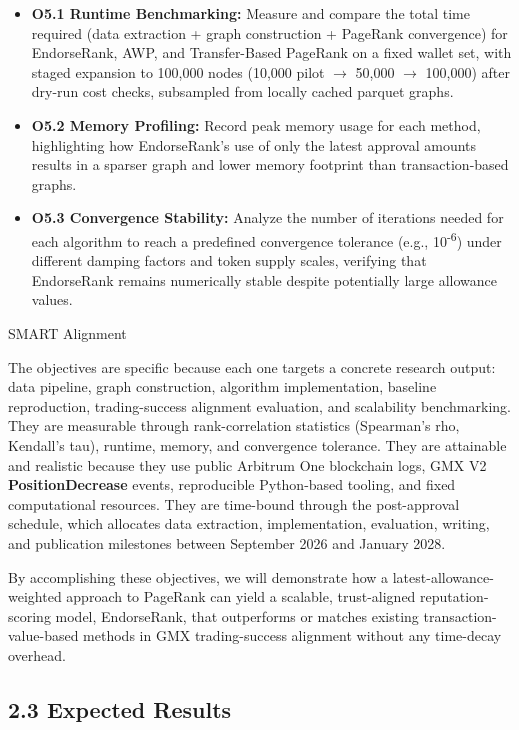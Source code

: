 \begin{itemize}
\item[\textbullet] \textbf{O5.1 Runtime Benchmarking: }Measure and compare the total time required (data extraction + graph construction + PageRank convergence) for EndorseRank, AWP, and Transfer-Based PageRank on a fixed wallet set, with staged expansion to 100,000 nodes (10,000 pilot $\to$ 50,000 $\to$ 100,000) after dry-run cost checks, subsampled from locally cached parquet graphs.
\item[\textbullet] \textbf{O5.2 Memory Profiling: }Record peak memory usage for each method, highlighting how EndorseRank's use of only the latest approval amounts results in a sparser graph and lower memory footprint than transaction-based graphs.
\item[\textbullet] \textbf{O5.3 Convergence Stability}\textbf{: }Analyze the number of iterations needed for each algorithm to reach a predefined convergence tolerance (e.g., 10\textsuperscript{-}\textsuperscript{6}) under different damping factors and token supply scales, verifying that EndorseRank remains numerically stable despite potentially large allowance values.
\end{itemize}
SMART Alignment


The objectives are specific because each one targets a concrete research output: data pipeline, graph construction, algorithm implementation, baseline reproduction, trading-success alignment evaluation, and scalability benchmarking. They are measurable through rank-correlation statistics (Spearman's rho, Kendall's tau), runtime, memory, and convergence tolerance. They are attainable and realistic because they use public Arbitrum One blockchain logs, GMX V2 \textbf{PositionDecrease} events, reproducible Python-based tooling, and fixed computational resources. They are time-bound through the post-approval schedule, which allocates data extraction, implementation, evaluation, writing, and publication milestones between September 2026 and January 2028.


By accomplishing these objectives, we will demonstrate how a latest-allowance-weighted approach to PageRank can yield a scalable, trust-aligned reputation-scoring model, EndorseRank, that outperforms or matches existing transaction-value-based methods in GMX trading-success alignment without any time-decay overhead.


\subsection*{2.3 Expected Results}
\label{sec:expected-results}

